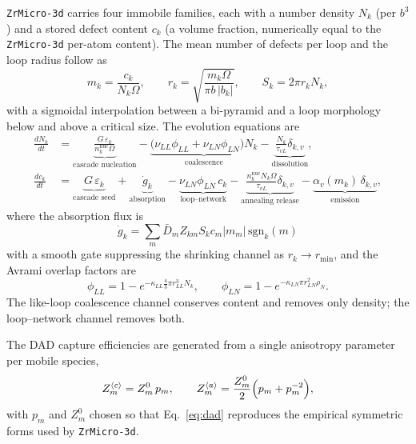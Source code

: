 \documentclass{article}
\newcommand{\aloop}{\ensuremath{\langle a\rangle}}
\newcommand{\cloop}{\ensuremath{\langle c\rangle}}
\newcommand{\ZrM}{\texttt{ZrMicro-3d}}
\begin{document}
\ZrM{} carries four immobile families, each with a number density $N_k$ (per
$b^3$) and a stored defect content $c_k$ (a volume fraction, numerically equal
to the \ZrM{} per-atom content). The mean number of defects per loop and the
loop radius follow as
\begin{equation}
m_k = \frac{c_k}{N_k \Omega},
\qquad
r_k = \sqrt{\frac{m_k \Omega}{\pi b\,|b_k|}},
\qquad
S_k = 2\pi r_k N_k ,
\label{eq:geometry}
\end{equation}
with a sigmoidal interpolation between a bi-pyramid and a loop morphology below
and above a critical size. The evolution equations are
\begin{align}
\frac{dN_k}{dt} &=
\underbrace{\frac{G\,\varepsilon_k}{n^{\text{nuc}}_k \Omega}}_{\text{cascade nucleation}}
- \underbrace{\bigl(\nu_{LL}\phi_{LL} + \nu_{LN}\phi_{LN}\bigr) N_k}_{\text{coalescence}}
- \underbrace{\frac{N_k}{\tau_{vL}}\delta_{k,v}}_{\text{dissolution}} ,
\label{eq:dNdt}\\[1mm]
\frac{dc_k}{dt} &=
\underbrace{G\,\varepsilon_k}_{\text{cascade seed}}
+ \underbrace{\dot{g}_k}_{\text{absorption}}
- \underbrace{\nu_{LN}\phi_{LN}\,c_k}_{\text{loop--network}}
- \underbrace{\frac{n^{\text{nuc}}_k N_k \Omega}{\tau_{vL}}\delta_{k,v}}_{\text{annealing release}}
- \underbrace{\alpha_v(m_k)\,\delta_{k,v}}_{\text{emission}} ,
\label{eq:dcdt}
\end{align}
where the absorption flux is
\begin{equation}
\dot{g}_k = \sum_m \bar{D}_m Z_{km} S_k c_m |m_m| \,\mathrm{sgn}_k(m)
\label{eq:gdot}
\end{equation}
with a smooth gate suppressing the shrinking channel as $r_k \to r_{\min}$, and
the Avrami overlap factors are
\begin{equation}
\phi_{LL} = 1 - e^{-\kappa_{LL}\frac{4}{3}\pi r_{LL}^3 N_k},
\qquad
\phi_{LN} = 1 - e^{-\kappa_{LN}\pi r_{LN}^2 \rho_N}.
\label{eq:avrami}
\end{equation}
The like-loop coalescence channel conserves content and removes only density; the
loop--network channel removes both.

The DAD capture efficiencies are generated from a single anisotropy parameter per
mobile species,
\begin{equation}
Z^{\cloop}_m = Z^0_m\,p_m ,
\qquad
Z^{\aloop}_m = \frac{Z^0_m}{2}\Bigl(p_m + p_m^{-2}\Bigr),
\label{eq:dad}
\end{equation}
with $p_m$ and $Z^0_m$ chosen so that Eq.~\eqref{eq:dad} reproduces the empirical
symmetric forms used by \ZrM{}.
\end{document}
